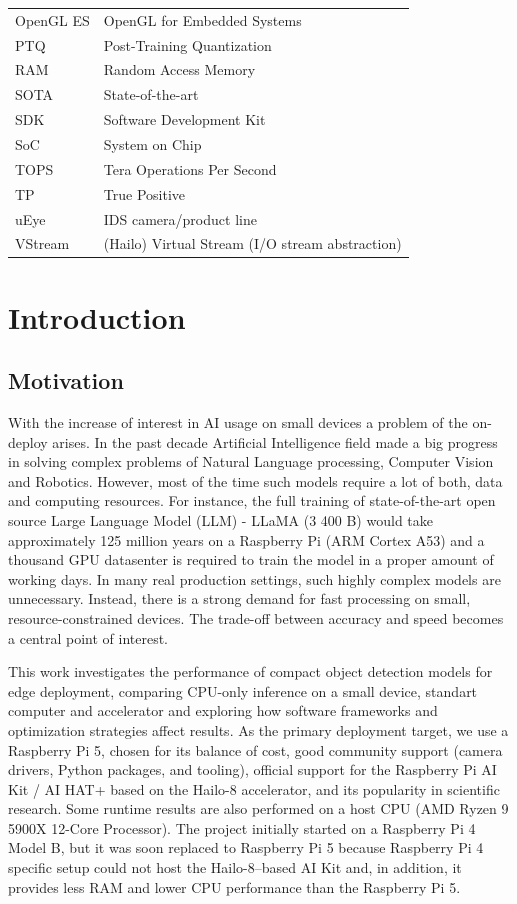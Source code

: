 \documentclass[12pt,a4paper]{report}
\begin{document}
\begin{longtable}{@{}p{3cm}p{10cm}@{}}
OpenGL ES & OpenGL for Embedded Systems \\
PTQ & Post-Training Quantization \\
RAM & Random Access Memory \\
SOTA & State-of-the-art \\
SDK & Software Development Kit \\
SoC & System on Chip \\
TOPS & Tera Operations Per Second \\
TP & True Positive \\
uEye & IDS camera/product line \\
VStream & (Hailo) Virtual Stream (I/O stream abstraction) \\

\end{longtable}
\cleardoublepage
\cleardoublepage
\hypersetup{pageanchor=true}

\chapter{Introduction}

\section{Motivation}

With the increase of interest in AI usage on small devices a problem of the on-deploy arises.
In the past decade Artificial Intelligence field made a big progress in solving complex problems
of Natural Language processing, Computer Vision and Robotics. However, most of the time
such models require a lot of both, data and computing resources. For instance, the full training
of state-of-the-art open source Large Language Model (LLM) - LLaMA (3 400 B)
\cite{meta_llama3_github} would take approximately 125 million years on
a Raspberry Pi (ARM Cortex A53) and a thousand GPU datasenter is required to train the model
in a proper amount of working days. In many real production settings, such highly complex
models are unnecessary. Instead, there is a strong demand for fast processing on small,
resource-constrained devices. The trade-off between accuracy and speed becomes a central
point of interest.

This work investigates the performance of compact object detection models for edge deployment,
comparing CPU-only inference on a small device, standart computer and accelerator and exploring how software
frameworks and optimization strategies affect results. As the primary deployment
target, we use a Raspberry Pi 5, chosen for its balance of cost, good community support
(camera drivers, Python packages, and tooling), official support for the Raspberry Pi AI Kit
/ AI HAT+ based on the Hailo-8 accelerator, and its popularity in scientific research. Some runtime
results are also performed on a host CPU (AMD Ryzen 9 5900X 12-Core Processor).
The project initially started on a Raspberry Pi 4 Model B, but it was soon replaced to Raspberry Pi 5
because Raspberry Pi 4 specific setup could not host the Hailo-8–based AI Kit and, in addition,
it provides less RAM and lower CPU performance than the Raspberry Pi 5.
\end{document}
